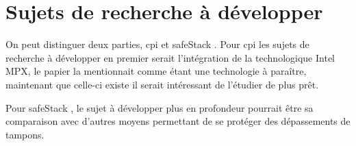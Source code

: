 \section{Sujets de recherche à développer}

On peut distinguer deux parties, \gls{cpi} et \og \gls{safeStack} \fg.
Pour \gls{cpi} les sujets de recherche à développer en premier serait l'intégration
de la technologique Intel MPX, le papier la mentionnait comme étant une technologie
à paraître, maintenant que celle-ci existe il serait intéressant de l'étudier de
plus prêt.

Pour \og \gls{safeStack} \fg, le sujet à développer plus en profondeur pourrait
être sa comparaison avec d'autres moyens permettant de se protéger des dépassements
de tampons.

